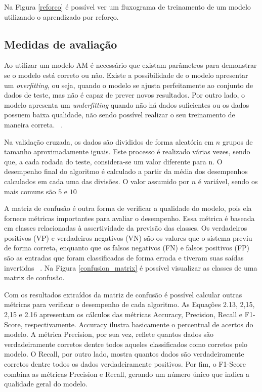           Na Figura \ref{reforco} é possível ver um fluxograma de treinamento de um modelo utilizando o aprendizado por reforço.


  \subsection{Medidas de avaliação}
          Ao utilizar um modelo \acrshort{AM} é necessário que existam parâmetros para demonstrar se o modelo está correto ou não. Existe a possibilidade de o modelo apresentar
           um \textit{overfitting}, ou seja, quando o modelo se ajusta perfeitamente ao conjunto de dados de teste, mas não é capaz de prever novos resultados. 
           Por outro lado, o modelo apresenta um \textit{underfitting} quando não há dados suficientes ou os dados possuem baixa qualidade, não sendo possível realizar o 
           seu treinamento de maneira correta. ~\cite{van2010process}.
          
          Na validação cruzada, os dados são divididos de forma aleatória em $n$ grupos de tamanho aproximadamente iguais. Este processo é realizado várias vezes, sendo que, a cada rodada do teste, considera-se um valor diferente para n. O desempenho final do algoritmo é calculado a partir da média dos desempenhos calculados em cada uma das divisões. O valor assumido por $n$ é variável, sendo os mais comuns são $5$ e $10$~\cite{kohavi1995study}


          A matriz de confusão é outra forma de verificar a qualidade do modelo, pois ela fornece métricas importantes 
          para avaliar o desempenho. Essa métrica é baseada em classes relacionadas à assertividade da previsão das classes. Os verdadeiros positivos  (VP) e verdadeiros negativos (VN)
          são os valores que o sistema previu de forma correta, enquanto que os falsos negativos (FN) e falsos positivos (FP)  são 
          as entradas que foram classificadas de forma errada e tiveram suas saídas invertidas ~\cite{martin}. Na Figura \ref{confusion_matrix} é possível visualizar
          as classes de uma matriz de confusão.




          Com os resultados extraídos da matriz de confusão é possível calcular outras métricas para verificar o desempenho de cada algoritmo. As Equações 2.13, 2,15, 2,15 e 2.16 apresentam os cálculos das métricas Accuracy, Precision, Recall e F1-Score, respectivamente. 
          Accuracy ilustra basicamente o percentual de acertos do modelo. A métrica Precision, por sua vez, reflete quantos dados são verdadeiramente corretos 
          dentre todos aqueles classificados como corretos pelo modelo. O Recall, por outro lado, mostra quantos dados são verdadeiramente corretos
           dentre todos os dados verdadeiramente positivos. Por fim, o F1-Score combina as métricas Precision e Recall, gerando um número único que indica a qualidade geral do modelo.

